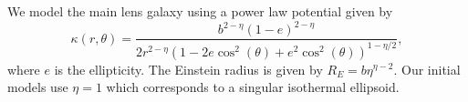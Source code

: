 We model the main lens galaxy using a power law potential given by
\begin{equation}
\label{eqn:powerlaw}
\kappa(r, \theta) = \frac{b^{2 - \eta} (1 - e)^ {2 - \eta}}{2 r^{2 - \eta} (1 - 2 e \cos^2(\theta) + e^2\cos^2(\theta))^{1 - \eta / 2}},
\end{equation}
where $e$ is the ellipticity. The Einstein radius is given by $R_E = b \eta^{\eta - 2}$. Our initial models use $\eta = 1$ which corresponds to a singular isothermal ellipsoid.